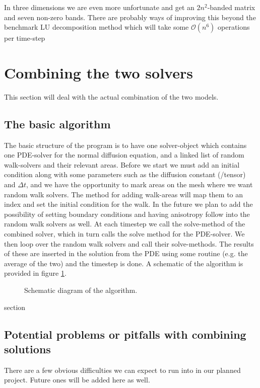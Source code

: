 In three dimensions we are even more unfortunate and get an $2n^2$-banded matrix and seven non-zero bands. There are probably ways of improving this beyond the benchmark LU decomposition method which will take some $\mathcal{O}(n^6)$ operations per time-step

\section{Combining the two solvers}\label{combining_the_solvers}
This section will deal with the actual combination of the two models.\\

\subsection{The basic algorithm}\label{basic_algorithm}

The basic structure of the program is to have one solver-object which contains one PDE-solver for the normal diffusion equation, and a linked list of random walk-solvers and their relevant areas. 
Before we start we must add an initial condition along with some parameters such as the diffusion constant (/tensor) and $\Delta t$, and we have the opportunity to mark areas on the mesh where we want random walk solvers. 
The method for adding walk-areas will map them to an index and set the initial condition for the walk. 
In the future we plan to add the possibility of setting boundary conditions and having anisotropy follow into the random walk solvers as well.
At each timestep we call the solve-method of the combined solver, which in turn calls the solve method for the PDE-solver. 
We then loop over the random walk solvers and call their solve-methods. 
The results of these are inserted in the solution from the PDE using some routine (e.g. the average of the two) and the timestep is done. 
A schematic of the algorithm is provided in figure \ref{schematic}.

\begin{figure}[H]
\centering
\caption[Algorithm]{Schematic diagram of the algorithm.}
\label{schematic}
\end{figure}
section
\subsection{Potential problems or pitfalls with combining solutions}\label{problems_and_pitfalls}

There are a few obvious difficulties we can expect to run into in our planned project. 
Future ones will be added here as well.

